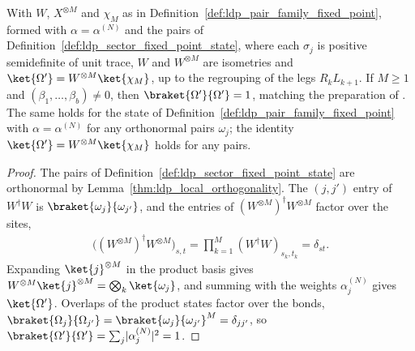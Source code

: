\begin{lemma}
    \label{thm:ldp_ghz_form}
    \leanok
    With $W$, $X^{\otimes M}$ and $\chi_M$ as in
    Definition~\ref{def:ldp_pair_family_fixed_point}, formed with
    $\alpha=\alpha^{(N)}$ and the pairs of
    Definition~\ref{def:ldp_sector_fixed_point_state}, where each $\sigma_j$ is
    positive semidefinite of unit trace, $W$ and $W^{\otimes M}$ are isometries
    and $\ket{\Omega'}=W^{\otimes M}\ket{\chi_M}$, up to the regrouping of the
    legs $R_kL_{k+1}$. If $M\geq1$ and $(\beta_1,\dots,\beta_b)\neq0$,
    then $\braket{\Omega'}{\Omega'}=1$, matching the preparation of
    \cite[eq.~(19)]{Malz2024Preparation}. The same holds for the state of
    Definition~\ref{def:ldp_pair_family_fixed_point} with $\alpha=\alpha^{(N)}$
    for any orthonormal pairs $\omega_j$; the identity
    $\ket{\Omega'}=W^{\otimes M}\ket{\chi_M}$ holds for any pairs.
\end{lemma}

\begin{proof}
    \leanok
    The pairs of Definition~\ref{def:ldp_sector_fixed_point_state} are
    orthonormal by Lemma~\ref{thm:ldp_local_orthogonality}. The $(j,j')$ entry of $W^\dagger W$ is $\braket{\omega_j}{\omega_{j'}}$, and the
    entries of $(W^{\otimes M})^\dagger W^{\otimes M}$ factor over the sites,
    \begin{align*}
        \bigl((W^{\otimes M})^\dagger W^{\otimes M}\bigr)_{s,t}
        =\prod_{k=1}^M(W^\dagger W)_{s_k,t_k}=\delta_{st}.
    \end{align*}
    Expanding
    $\ket{j}^{\otimes M}$ in the product basis gives
    $W^{\otimes M}\ket{j}^{\otimes M}=\bigotimes_k\ket{\omega_j}$, and summing with the
    weights $\alpha^{(N)}_j$ gives $\ket{\Omega'}$. Overlaps of the product states factor
    over the bonds,
    $\braket{\Omega_j}{\Omega_{j'}}=\braket{\omega_j}{\omega_{j'}}^M=\delta_{jj'}$, so
    $\braket{\Omega'}{\Omega'}=\sum_j\lvert\alpha^{(N)}_j\rvert^2=1$.
\end{proof}

